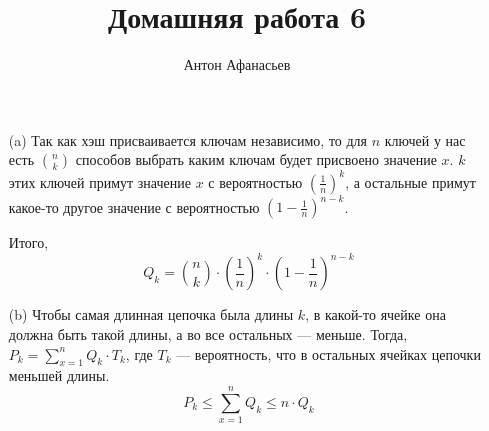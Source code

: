 \documentclass[10pt]{article}
\begin{document}
\title{Домашняя работа 6}
\author{Антон Афанасьев}
\maketitle

\begin{enumerate}
	\item[(a)] Так как хэш присваивается ключам независимо, то для $n$ ключей у нас есть $\binom{n}{k}$ способов выбрать каким ключам будет присвоено значение $x$. $k$ этих ключей примут значение $x$ с вероятностью $\left ( \frac{1}{n} \right ) ^k$, а остальные примут какое-то другое значение с вероятностью $\left ( 1- \frac{1}{n} \right ) ^ {n-k} $.
	
	Итого, $$Q_k = \binom{n}{k} \cdot \left ( \frac{1}{n} \right ) ^k \cdot \left ( 1- \frac{1}{n} \right ) ^ {n-k} $$
	
	\item[(b)] Чтобы самая длинная цепочка была длины $k$, в какой-то ячейке она должна быть такой длины, а во все остальных --- меньше. Тогда, $P_k = \sum_{x=1}^n Q_k \cdot T_k$, где $T_k$ --- вероятность, что в остальных ячейках цепочки меньшей длины.
		$$P_k \le \sum_{x=1}^n Q_k \le n\cdot Q_k$$
\end{enumerate}
\end{document}
